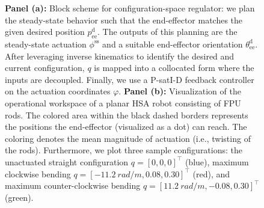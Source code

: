 \begin{figure}[ht]
    \centering
    \caption{\textbf{Panel (a):} Block scheme for configuration-space regulator: we plan the steady-state behavior such that the end-effector matches the given desired position $p_\mathrm{ee}^\mathrm{d}$. The outputs of this planning are the steady-state actuation $\phi^\mathrm{ss}$ and a suitable end-effector orientation $\theta_\mathrm{ee}^\mathrm{d}$. After leveraging inverse kinematics to identify the desired and current configuration, $q$ is mapped into a collocated form where the inputs are decoupled. Finally, we use a P-satI-D feedback controller on the actuation coordinates $\varphi$. \textbf{Panel (b):} Visualization of the operational workspace of a planar HSA robot consisting of FPU rods. The colored area within the black dashed borders represents the positions the end-effector (visualized as a dot) can reach. The coloring denotes the mean magnitude of actuation (i.e., twisting of the rods). Furthermore, we plot three sample configurations: the unactuated straight configuration $q = [0, 0, 0]^\top$ (blue), maximum clockwise bending $q = [\SI{-11.2}{rad \per m}, 0.08, 0.30]^\top$ (red), and maximum counter-clockwise bending $q = [\SI{11.2}{rad \per m}, -0.08, 0.30]^\top$ (green).}
\end{figure}

